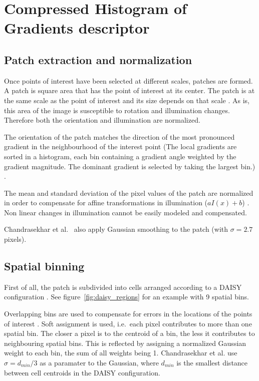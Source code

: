 \section{Compressed Histogram of Gradients descriptor}
\label{sec:feature_descriptor}

\subsection{Patch extraction and normalization}

Once points of interest have been selected at different scales, patches are formed. A patch is square area that has the point of interest at its center. The patch is at the same scale as the point of interest and its size depends on that scale \cite{Mikolajczyk2005PEL}. As is, this area of the image is susceptible to rotation and illumination changes. Therefore both the orientation and illumination are normalized.

The orientation of the patch matches the direction of the most pronounced gradient in the neighbourhood of the interest point (The local gradients are sorted in a histogram, each bin containing a gradient angle weighted by the gradient magnitude. The dominant gradient is selected by taking the largest bin.) \cite{Lowe04distinctiveimage}.

The mean and standard deviation of the pixel values of the patch are normalized in order to compensate for affine transformations in illumination ($aI(x) + b$) \cite{Mikolajczyk2005PEL}. Non linear changes in illumination cannot be easily modeled and compensated.

Chandrasekhar et al.\ \cite{chog2011} also apply Gaussian smoothing to the patch (with $\sigma = 2.7$ pixels).

\subsection{Spatial binning}

First of all, the patch is subdivided into cells arranged according to a DAISY configuration \cite{Tola08,best_daisy}. See figure~\ref{fig:daisy_regions} for an example with 9 spatial bins.

Overlapping bins are used to compensate for errors in the locations of the points of interest \cite{chog2011}. Soft assignment is used, i.e.\ each pixel contributes to more than one spatial bin. The closer a pixel is to the centroid of a bin, the less it contributes to neighbouring spatial bins. This is reflected by assigning a normalized Gaussian weight to each bin, the sum of all weights being 1. Chandrasekhar et al.\cite{chog2011} use $\sigma=d_{min}/3$ as a paramater to the Gaussian, where $d_{min}$ is the smallest distance between cell centroids in the DAISY configuration.

